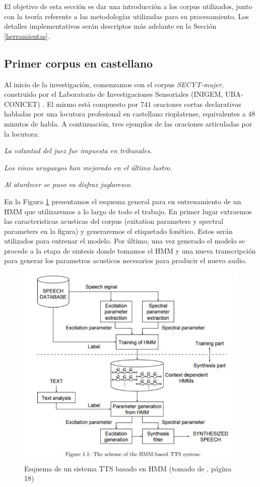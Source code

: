 El objetivo de esta sección es dar una introducción a los corpus utilizados, junto con la teoría referente a las metodologías utilizadas para su procesamiento. Los detalles implementativos serán descriptos más adelante en la Sección \ref{herramientas}.

\subsection{Primer corpus en castellano} \label{firstCorpus}

Al inicio de la investigación, comenzamos con el corpus \textit{SECYT-mujer}, construido por el Laboratorio de Investigaciones Sensoriales (INIGEM, UBA-CONICET) \cite{secytMujer}. El mismo está compuesto por $741$ oraciones cortas declarativas habladas por una locutora profesional en castellano rioplatense, equivalentes a $48$ minutos de habla. A continuación, tres ejemplos de las oraciones articuladas por la locutora:

\indent\indent \textit{La voluntad del juez fue impuesta en tribunales.}

\indent\indent \textit{Los vinos uruguayos han mejorado en el último lustro.}

\indent\indent \textit{Al atardecer se puso su disfraz juglaresco.}

En la Figura \ref{pipeline} presentamos el esquema general para en entrenamiento de un HMM que utilizaremos a lo largo de todo el trabajo. En primer lugar extraemos las caracteristicas acusticas del corpus (exitation parameters y spectral parameters en la figura) y generaremos el etiquetado fonético. Estos serán utilizados para entrenar el modelo. Por último, una vez generado el modelo se procede a la etapa de sintesis donde tomamos el HMM y una nueva transcripción para generar los parametros acusticos necesarios para producir el nuevo audio.

\begin{figure}
\includegraphics[scale=0.5]{imagenes/pipeline.png}
\centering
\caption{Esquema de un sistema TTS basado en HMM (tomado de \cite{phoneticAndProsodic}, página 18)}
\label{pipeline}
\end{figure}

